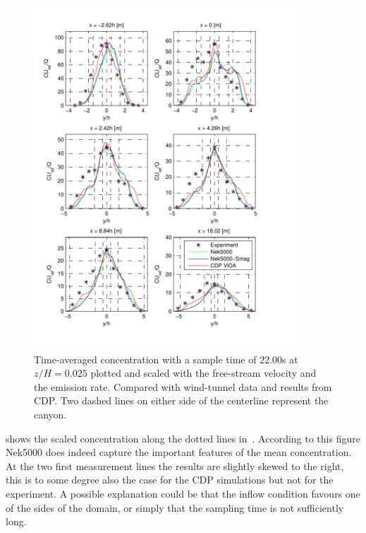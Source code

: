 \begin{figure}[h]
    \centering
    \includegraphics[width=0.9\textwidth]{Figures/NekcH_all.pdf}
    \caption{Time-averaged concentration with a sample time of $22.00$s at $z/H = 0.025$ plotted
    and scaled with the free-stream velocity and the emission rate. Compared with wind-tunnel data 
    and results from CDP. Two dashed lines on either side of the centerline represent the canyon.}
    \label{fig:cHall}
\end{figure}

 shows the scaled concentration along the dotted lines in~. 
According to this figure Nek5000 does indeed capture the important features of the mean concentration.
At the two first measurement lines the results are slightly skewed to the right, this is to some degree 
also the case for the CDP simulations but not for the experiment. A possible explanation could be that 
the inflow condition favours one of the sides of the domain, or simply that the sampling time is not 
sufficiently long. 

